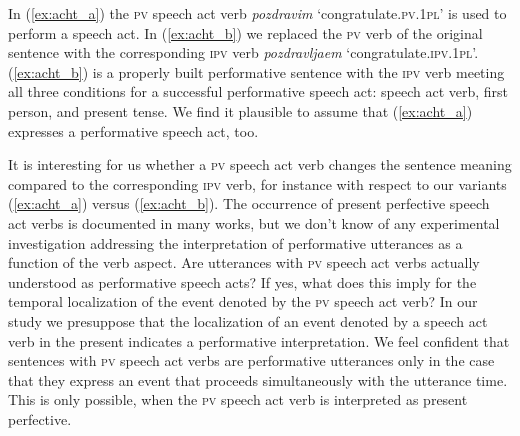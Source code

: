\documentclass[output=paper,
colorlinks,
citecolor=brown,
newtxmath,
hidelinks
]{langscibook}
\begin{document}
\ea\label{ex:acht}
            \z
\z

\noindent In (\ref{ex:acht_a}) the \textsc{pv} speech act verb \textit{pozdravim} ‘congratulate\textsc{.pv.1pl}’ is used to perform a speech act. In (\ref{ex:acht_b}) we replaced the \textsc{pv} verb of the original sentence with the corresponding \textsc{ipv} verb \textit{pozdravljaem} ‘congratulate\textsc{.ipv.1pl}’. (\ref{ex:acht_b}) is a properly built performative sentence with the \textsc{ipv} verb meeting all three conditions for a successful performative speech act: speech act verb, first person, and present tense. We find it plausible to assume that (\ref{ex:acht_a}) expresses a performative speech act, too.

It is interesting for us whether a \textsc{pv} speech act verb changes the sentence meaning compared to the corresponding \textsc{ipv} verb, for instance with respect to our variants (\ref{ex:acht_a}) versus (\ref{ex:acht_b}). The occurrence of present perfective speech act verbs is documented in many works, but we don't know of any experimental investigation addressing the interpretation of performative utterances as a function of the verb aspect. Are utterances with \textsc{pv} speech act verbs actually understood as performative speech acts? If yes, what does this imply for the temporal localization of the event denoted by the \textsc{pv} speech act verb? In our study we presuppose that the localization of an event denoted by a speech act verb in the present indicates a performative interpretation. We feel confident that sentences with \textsc{pv} speech act verbs are performative utterances only in the case that they express an event that proceeds simultaneously with the utterance time. This is only possible, when the \textsc{pv} speech act verb is interpreted as present perfective.  
\end{document}
